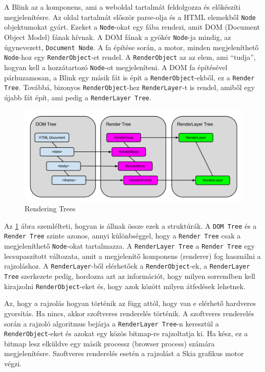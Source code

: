 \documentclass[12pt]{report}
\begin{document}
A Blink az a komponens, ami a weboldal tartalmát feldolgozza és előkészíti megjelenítésre.
Az oldal tartalmát először parse-olja és a HTML elemekből \texttt{Node} objektumokat gyárt.
Ezeket a \texttt{Node}-okat egy fába rendezi, amit DOM (Document Object Model) fának hívnak.
A DOM fának a gyökér \texttt{Node}-ja mindig, az úgynevezett, \texttt{Document Node}.
A fa építése során, a motor, minden megjeleníthető \texttt{Node}-hoz egy
\texttt{RenderObject}-et rendel. A \texttt{RenderObject} az az elem, ami ``tudja'',
hogyan kell a hozzátartozó \texttt{Node}-ot megjeleníteni.
A DOM fa építésével párhuzamosan, a Blink egy másik fát is épít a
\texttt{RenderObject}-ekből, ez a \texttt{Render Tree}. Továbbá, bizonyos
\texttt{RenderObject}-hez \texttt{RenderLayer}-t is rendel, amiből egy újabb fát épít,
ami pedig a \texttt{RenderLayer Tree}.

\begin{figure}[h]
    \centering
    \includegraphics[scale=0.46]{rendering-trees}
    \caption{
        \label{fig:rendering-trees}
        Rendering Trees \cite{bib:chromium-oopifs}
    }
\end{figure}

\noindent
Az \ref{fig:rendering-trees} ábra szemlélteti, hogyan is állnak össze ezek a struktúrák.
A \texttt{DOM Tree} és a \texttt{Render Tree} szinte azonos, annyi különbséggel, hogy
a \texttt{Render Tree} csak a megjeleníthető \texttt{Node}-okat tartalmazza.
A \texttt{RenderLayer Tree} a \texttt{Render Tree} egy lecsupaszított változata, amit a
megjelenítő komponens (renderer) fog használni a rajzoláshoz.
A \texttt{RenderLayer}-ből elérhetőek a \texttt{RenderObject}-ek, a \texttt{RenderLayer Tree}
szerkezete pedig, hordozza azt az információt, hogy milyen sorrendben kell kirajzolni
\texttt{RenderObject}-eket és, hogy azok között milyen átfedések lehetnek.

Az, hogy a rajzolás hogyan történik az függ attól, hogy van e elérhető hardveres gyorsítás.
Ha nincs, akkor szoftveres renderelés történik. A szoftveres renderelés során a rajzoló
algoritmus bejárja a \texttt{RenderLayer Tree}-n keresztül a \texttt{RenderObject}-eket és
azokat egy közös bitmap-re rajzoltatja ki. Ha kész, ez a bitmap lesz elküldve egy másik
processz (browser process) számára megjelenítésre. Szoftveres renderelés esetén a rajzolást
a Skia grafikus motor végzi.
\end{document}
